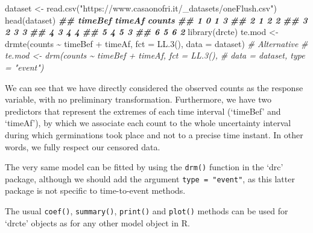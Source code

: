 \documentclass[
]{book}
\newenvironment{Shaded}{\begin{snugshade}}{\end{snugshade}}
\newcommand{\AttributeTok}[1]{\textcolor[rgb]{0.77,0.63,0.00}{#1}}
\newcommand{\CommentTok}[1]{\textcolor[rgb]{0.56,0.35,0.01}{\textit{#1}}}
\newcommand{\DocumentationTok}[1]{\textcolor[rgb]{0.56,0.35,0.01}{\textbf{\textit{#1}}}}
\newcommand{\FunctionTok}[1]{\textcolor[rgb]{0.00,0.00,0.00}{#1}}
\newcommand{\NormalTok}[1]{#1}
\newcommand{\OtherTok}[1]{\textcolor[rgb]{0.56,0.35,0.01}{#1}}
\newcommand{\SpecialCharTok}[1]{\textcolor[rgb]{0.00,0.00,0.00}{#1}}
\newcommand{\StringTok}[1]{\textcolor[rgb]{0.31,0.60,0.02}{#1}}
\begin{document}
\begin{Shaded}
\begin{Highlighting}[]
\NormalTok{dataset }\OtherTok{\textless{}{-}} \FunctionTok{read.csv}\NormalTok{(}\StringTok{"https://www.casaonofri.it/\_datasets/oneFlush.csv"}\NormalTok{)}
\FunctionTok{head}\NormalTok{(dataset)}
\DocumentationTok{\#\#   timeBef timeAf counts}
\DocumentationTok{\#\# 1       0      1      3}
\DocumentationTok{\#\# 2       1      2      2}
\DocumentationTok{\#\# 3       2      3      3}
\DocumentationTok{\#\# 4       3      4      4}
\DocumentationTok{\#\# 5       4      5      3}
\DocumentationTok{\#\# 6       5      6      2}
\FunctionTok{library}\NormalTok{(drcte)}
\NormalTok{te.mod }\OtherTok{\textless{}{-}} \FunctionTok{drmte}\NormalTok{(counts }\SpecialCharTok{\textasciitilde{}}\NormalTok{ timeBef }\SpecialCharTok{+}\NormalTok{ timeAf, }\AttributeTok{fct =} \FunctionTok{LL.3}\NormalTok{(),}
                \AttributeTok{data =}\NormalTok{ dataset)}
\CommentTok{\# Alternative}
\CommentTok{\# te.mod \textless{}{-} drm(counts \textasciitilde{} timeBef + timeAf, fct = LL.3(),}
\CommentTok{\#                 data = dataset, type = "event")}
\end{Highlighting}
\end{Shaded}

We can see that we have directly considered the observed counts as the response variable, with no preliminary transformation. Furthermore, we have two predictors that represent the extremes of each time interval (`timeBef' and `timeAf'), by which we associate each count to the whole uncertainty interval during which germinations took place and not to a precise time instant. In other words, we fully respect our censored data.

The very same model can be fitted by using the \texttt{drm()} function in the `drc' package, although we should add the argument \texttt{type\ =\ "event"}, as this latter package is not specific to time-to-event methods.

The usual \texttt{coef()}, \texttt{summary()}, \texttt{print()} and \texttt{plot()} methods can be used for `drcte' objects as for any other model object in R.
\end{document}
